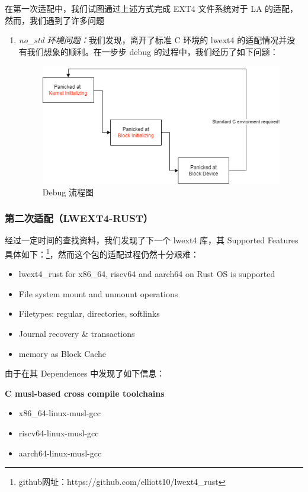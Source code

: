 在第一次适配中，我们试图通过上述方式完成 EXT4 文件系统对于 LA 的适配，然而，我们遇到了许多问题
\begin{enumerate} 
    \item \textit{no_std 环境问题：}我们发现，离开了标准 C 环境的 lwext4 的适配情况并没有我们想象的顺利。在一步步 debug 的过程中，我们经历了如下问题：
    \begin{figure}[htbp] 
        \centering 
        \includegraphics[width=0.5\linewidth]{figs/ext4c.png} 
        \caption{Debug 流程图} 
        \label{debug-ext4c} 
    \end{figure} 
\end{enumerate}

\subsubsection{第二次适配（LWEXT4-RUST）}

经过一定时间的查找资料，我们发现了下一个 lwext4 库，其 Supported Features 具体如下：\footnote{github网址：https://github.com/elliott10/lwext4_rust}，然而这个包的适配过程仍然十分艰难：

\begin{itemize}
    \item lwext4_rust for x86_64, riscv64 and aarch64 on Rust OS is supported
    \item File system mount and unmount operations
    \item Filetypes: regular, directories, softlinks
    \item Journal recovery \& transactions
    \item memory as Block Cache
\end{itemize}

由于在其 Dependences 中发现了如下信息：

\begin{center}
    \textbf{C musl-based cross compile toolchains}
    \begin{itemize}
        \centering
        \item x86_64-linux-musl-gcc
        \item riscv64-linux-musl-gcc
        \item aarch64-linux-musl-gcc
    \end{itemize}
\end{center}

